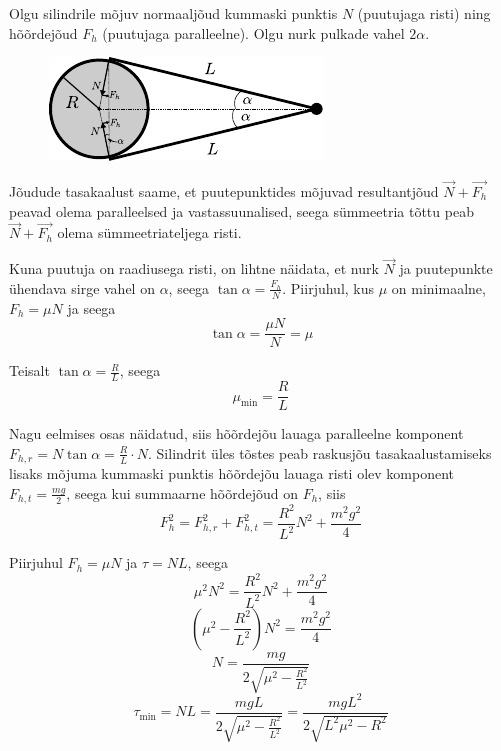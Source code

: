 \documentclass[10pt]{article}
\begin{document}
\setAuthor{}

\solu
\osa Olgu silindrile mõjuv normaaljõud kummaski punktis $N$ (puutujaga risti) ning hõõrdejõud $F_h$ (puutujaga paralleelne). Olgu nurk pulkade vahel $2\alpha$.

\begin{figure}[h]
\centering
\includegraphics[width=0.5\linewidth]{2020-v3g-07-yl.pdf}
\end{figure}

Jõudude tasakaalust saame, et puutepunktides mõjuvad resultantjõud $\vec N + \vec{F_h}$ peavad olema paralleelsed ja vastassuunalised, seega sümmeetria tõttu peab $\vec N + \vec{F_h}$ olema sümmeetriateljega risti.

Kuna puutuja on raadiusega risti, on lihtne näidata, et nurk $\vec N$ ja puutepunkte ühendava sirge vahel on $\alpha$, seega $\tan \alpha = \frac{F_h}{N}$. Piirjuhul, kus $\mu$ on minimaalne, $F_h = \mu N$ ja seega
$$\tan \alpha = \frac{\mu N}{N} = \mu$$

Teisalt $\tan \alpha = \frac{R}{L}$, seega
$$\mu_\text{min} = \frac{R}{L}$$

\osa Nagu eelmises osas näidatud, siis hõõrdejõu lauaga paralleelne komponent $F_{h,r} = N\tan \alpha = \frac{R}{L}\cdot N$. Silindrit üles tõstes peab raskusjõu tasakaalustamiseks lisaks mõjuma kummaski punktis hõõrdejõu lauaga risti olev komponent $F_{h,t} = \frac{mg}{2}$, seega kui summaarne hõõrdejõud on $F_h$, siis
$$F_h^2 = F_{h,r}^2 + F_{h,t}^2 = \frac{R^2}{L^2}N^2 + \frac{m^2g^2}{4}$$

Piirjuhul $F_h = \mu N$ ja $\tau = NL$, seega
$$\mu^2N^2 = \frac{R^2}{L^2}N^2 + \frac{m^2g^2}{4}$$
$$\left(\mu^2 - \frac{R^2}{L^2}\right)N^2 = \frac{m^2g^2}{4}$$
$$N = \frac{mg}{2\sqrt{\mu^2-\frac{R^2}{L^2}}}$$
$$\tau_\text{min} = NL = \frac{mgL}{2\sqrt{\mu^2-\frac{R^2}{L^2}}} = \frac{mgL^2}{2\sqrt{L^2\mu^2 - R^2}}$$
\probend
\bigskip

\end{document}

